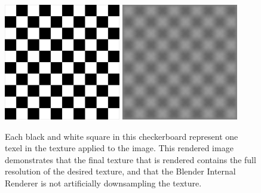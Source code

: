 \begin{figure}[H]
	\centering
	\includegraphics[height = 2in]{../fig/texres.png}
	\hspace{0.5in}
	\includegraphics[height = 2in]{../fig/texres2.png}
	\caption{Each black and white square in this checkerboard represent one texel in the texture applied to the image.  This rendered image demonstrates that the final texture that is rendered contains the full resolution of the desired texture, and that the Blender Internal Renderer is not artificially downsampling the texture.}
	\label{fig:texres}
\end{figure}
